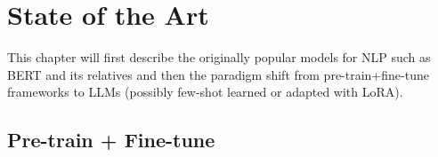 
\chapter{State of the Art}
This chapter will first describe the originally popular models for NLP such as BERT and its relatives and then the paradigm shift from pre-train+fine-tune frameworks to LLMs (possibly few-shot learned or adapted with LoRA). 
\label{chap:sota}
\section{Pre-train + Fine-tune}
\label{sec:pretrain}